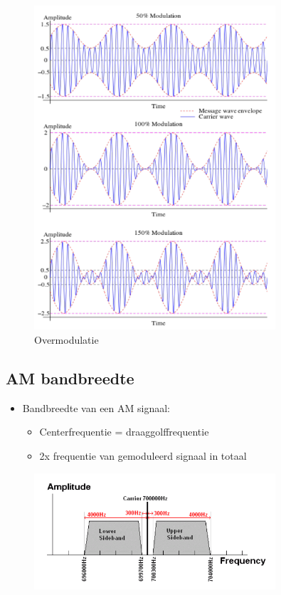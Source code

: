 \documentclass{article}
\begin{document}
\begin{figure}[H]
    \centering
    \includegraphics[width=0.8\textwidth]{Screenshot_20200302_120354.png}
    \caption{Overmodulatie}
\end{figure}

\subsection{AM bandbreedte}
\begin{itemize}
    \item Bandbreedte van een AM signaal:
    \begin{itemize}
        \item Centerfrequentie = draaggolffrequentie
        \item 2x frequentie van gemoduleerd signaal in totaal
    \end{itemize}
\end{itemize}

\begin{figure}[H]
    \centering
    \includegraphics[width=0.8\textwidth]{Screenshot_20200302_120508.png}
    \caption{}
\end{figure}
\end{document}
